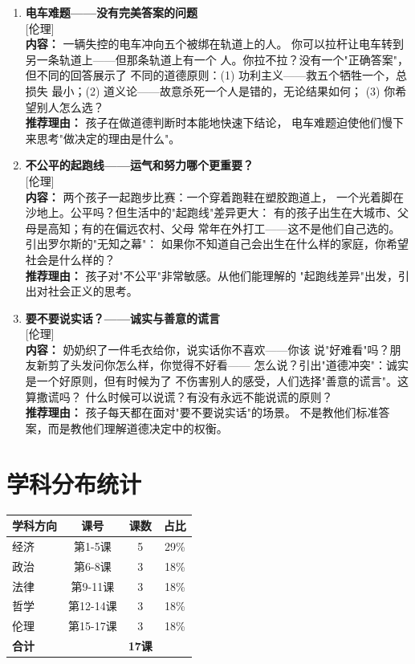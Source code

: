 \documentclass[a4paper,12pt]{ctexart}
\newcommand{\tagethics}{\textcolor{ethics}{\small [伦理]}}
\begin{document}
\begin{enumerate}

\item[\textbf{第15课}] \textbf{电车难题——没有完美答案的问题} \\
\tagethics \\
\textbf{内容：} 一辆失控的电车冲向五个被绑在轨道上的人。
你可以拉杆让电车转到另一条轨道上——但那条轨道上有一个
人。你拉不拉？没有一个"正确答案"，但不同的回答展示了
不同的道德原则：(1) 功利主义——救五个牺牲一个，总损失
最小；(2) 道义论——故意杀死一个人是错的，无论结果如何；
(3) 你希望别人怎么选？\\
\textbf{推荐理由：} 孩子在做道德判断时本能地快速下结论，
电车难题迫使他们慢下来思考"做决定的理由是什么"。

\item[\textbf{第16课}] \textbf{不公平的起跑线——运气和努力哪个更重要？} \\
\tagethics \\
\textbf{内容：} 两个孩子一起跑步比赛：一个穿着跑鞋在塑胶跑道上，
一个光着脚在沙地上。公平吗？但生活中的"起跑线"差异更大：
有的孩子出生在大城市、父母是高知；有的在偏远农村、父母
常年在外打工——这不是他们自己选的。引出罗尔斯的"无知之幕"：
如果你不知道自己会出生在什么样的家庭，你希望社会是什么样的？\\
\textbf{推荐理由：} 孩子对"不公平"非常敏感。从他们能理解的
"起跑线差异"出发，引出对社会正义的思考。

\item[\textbf{第17课}] \textbf{要不要说实话？——诚实与善意的谎言} \\
\tagethics \\
\textbf{内容：} 奶奶织了一件毛衣给你，说实话你不喜欢——你该
说"好难看"吗？朋友新剪了头发问你怎么样，你觉得不好看——
怎么说？引出"道德冲突"：诚实是一个好原则，但有时候为了
不伤害别人的感受，人们选择"善意的谎言"。这算撒谎吗？
什么时候可以说谎？有没有永远不能说谎的原则？\\
\textbf{推荐理由：} 孩子每天都在面对"要不要说实话"的场景。
不是教他们标准答案，而是教他们理解道德决定中的权衡。

\end{enumerate}

\newpage

\section*{\textcolor{blue!70!black}{学科分布统计}}

\begin{center}
\begin{tabular}{|l|c|c|c|}
\hline
\textbf{学科方向} & \textbf{课号} & \textbf{课数} & \textbf{占比} \\
\hline
经济 & 第1-5课 & 5 & 29\% \\
政治 & 第6-8课 & 3 & 18\% \\
法律 & 第9-11课 & 3 & 18\% \\
哲学 & 第12-14课 & 3 & 18\% \\
伦理 & 第15-17课 & 3 & 18\% \\
\hline
\textbf{合计} & & \textbf{17课} & \\
\hline
\end{tabular}
\end{center}
\end{document}
